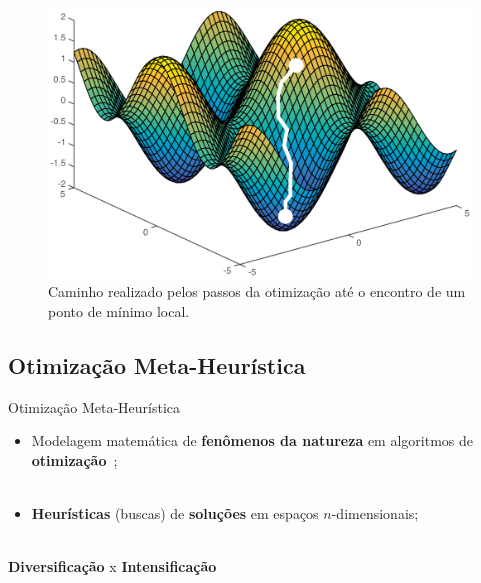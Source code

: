 \begin{frame}
	\begin{figure}
		\centering
		\includegraphics[scale=0.45]{figs/opt_function_opt.eps}	
		\caption{Caminho realizado pelos passos da otimização até o encontro de um ponto de mínimo local.}
		\label{f.opt_function_opt}
	\end{figure}
\end{frame}

\subsection{Otimização Meta-Heurística}
\label{ss.optimization_mh}

\begin{frame}{Otimização Meta-Heurística}
	\begin{itemize}
		\justifying
		\item Modelagem matemática de \textbf{fenômenos da natureza} em algoritmos de \textbf{otimização}~\cite{yang_review};
		\\~\\
		\item \textbf{Heurísticas} (buscas) de \textbf{soluções} em espaços $n$-dimensionais;
		\\~\\
	\end{itemize}
	\vspace*{0.5cm}
	\begin{block}{}
		\centering
		\textbf{Diversificação} x \textbf{Intensificação}
	\end{block}	
\end{frame}